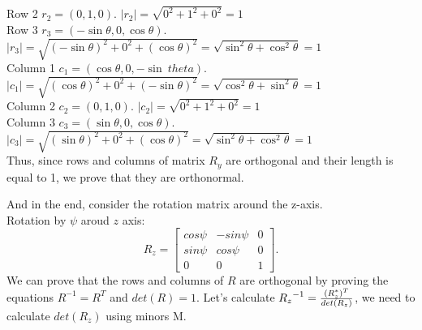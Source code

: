 \documentclass[a4paper, twoside, english]{article}
\begin{document}
{Row 2 $r_2=(0,1,0 )$. ${|r_2|}={\sqrt{0^2+1^2+0^2}} = 1$}\\
{Row 3 $r_3=(-\sin \theta,0 , \cos \theta )$. ${|r_3|}={\sqrt{(-\sin\theta)^2+0^2+(\cos \theta)^2}}={\sqrt{ \sin^2 \theta + \cos^2 \theta}} = 1$}\\
{Column 1 $c_1=(\cos \theta, 0, -\sin \ theta)$. ${{|c_1|}={\sqrt{(\cos \theta)^2+0^2+(-\sin \theta)^2}}={\sqrt{ \cos^2 \theta + \sin^2 \theta}}=1}$}\\
{Column 2 $c_2=(0,1,0 )$. ${|c_2|}={\sqrt{0^2+1^2+0^2}} = 1$}\\
{Column 3 $c_3=(\sin \theta,0 , \cos \theta )$. ${|c_3|}={\sqrt{(\sin\theta)^2+0^2+(\cos \theta)^2}}={\sqrt{ \sin^2 \theta + \cos^2 \theta}} = 1$}\\
Thus, since rows and columns of matrix $R_y$ are orthogonal and their length is equal to 1, we prove that they are orthonormal.

And in the end,  consider the rotation matrix around the z-axis.\\
Rotation by $\psi$ aroud $z$ axis:
\begin{equation}
	R_z = \left[
	\begin{array}{ccc}
		cos \psi & -sin \psi & 0 \\
		sin \psi & cos \psi & 0 \\
		0 & 0 & 1
	\end{array}
	\right].
	\label{eq:kmatrixZ}
\end{equation}
We can prove that the rows and columns of $R$ are orthogonal by proving the equations $R^{-1} = R^T$ and $det(R)=1.$
Let's calculate ${{R_z}^{-1}}={{(R_z^*)^T}\over{det(R_z)}}$, we need to calculate $det(R_z)$ using minors M.
\end{document}
